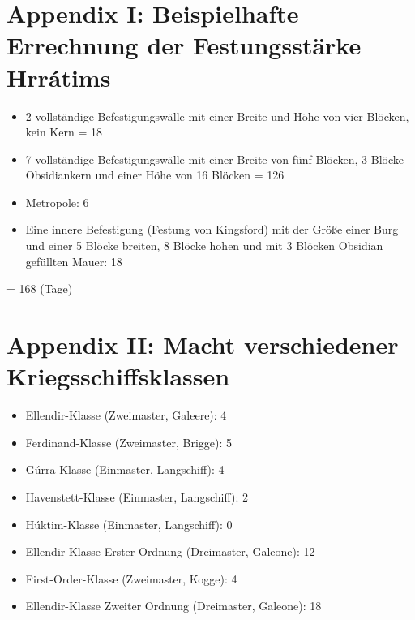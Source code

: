 \documentclass{article}
\begin{document}
\section{Appendix I: Beispielhafte Errechnung der Festungsstärke Hrrátims}
\begin{itemize}
	\item 2 vollständige Befestigungswälle mit einer Breite und Höhe von vier Blöcken, kein Kern = 18
	\item 7 vollständige Befestigungswälle mit einer Breite von fünf Blöcken, 3 Blöcke Obsidiankern und einer Höhe von 16 Blöcken = 126
	\item Metropole: 6
	\item Eine innere Befestigung (Festung von Kingsford) mit der Größe einer Burg und einer 5 Blöcke breiten, 8 Blöcke hohen und mit 3 Blöcken Obsidian gefüllten Mauer: 18
\end{itemize}

= 168 (Tage)

\section{Appendix II: Macht verschiedener Kriegsschiffsklassen}
\begin{itemize}
	\item Ellendir-Klasse (Zweimaster, Galeere): 4
	\item Ferdinand-Klasse (Zweimaster, Brigge): 5
	\item Gúrra-Klasse (Einmaster, Langschiff): 4
	\item Havenstett-Klasse (Einmaster, Langschiff): 2
	\item Húktim-Klasse (Einmaster, Langschiff): 0
	\item Ellendir-Klasse Erster Ordnung (Dreimaster, Galeone): 12
	\item First-Order-Klasse (Zweimaster, Kogge): 4
	\item Ellendir-Klasse Zweiter Ordnung (Dreimaster, Galeone): 18
\end{itemize}
\end{document}
